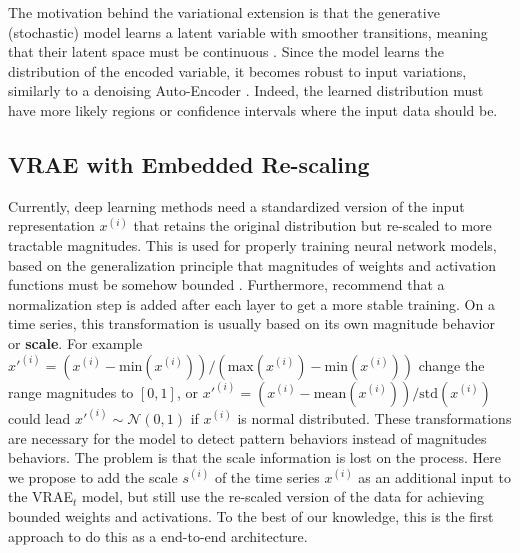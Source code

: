 The motivation behind the variational extension is that the generative (stochastic) model learns a latent variable with smoother transitions, meaning that their latent space must be continuous \citep{kingma2013auto}.
Since the model learns the distribution of the encoded variable, it becomes robust to input variations, similarly to a denoising Auto-Encoder \citep{vincent2010stacked}. Indeed, the learned distribution must have more likely regions or confidence intervals where the input data should be.


\subsection{VRAE with Embedded Re-scaling}

Currently, deep learning methods need a standardized version of the input representation $x^{(i)}$ that retains the original distribution but re-scaled to more tractable magnitudes. This is used for properly training neural network models, based on the generalization principle that magnitudes of weights and activation functions must be somehow bounded \citep{bishop1995neural,montavon2012neural}. 
Furthermore, \citep{ioffe2015batch} recommend that a normalization step is added after each layer to get a more stable training. 
On a time series, this transformation is usually based on its own magnitude behavior or \textbf{scale}.  %
For example $x'^{(i)} = (x^{(i)} - \mathrm{min}(x^{(i)}))/(\mathrm{max}(x^{(i)}) - \mathrm{min}(x^{(i)}))$ change the range magnitudes to $[0,1]$, or $x'^{(i)} = (x^{(i)}-\mathrm{mean}(x^{(i)}))/ \mathrm{std}(x^{(i)})$ could lead $x'^{(i)} \sim \mathcal{N}( 0,1)$ if $x^{(i)}$ is normal distributed. These transformations are necessary for the model to detect pattern behaviors instead of magnitudes behaviors. The problem is that the scale information is lost on the process. 
Here we propose to add the scale $s^{(i)}$ of the time series $x^{(i)}$ as an additional input to the VRAE$_t$ model, but still use the re-scaled version of the data for achieving bounded weights and activations. To the best of our knowledge, this is the first approach to do this as a end-to-end architecture.

